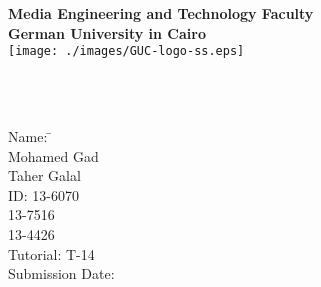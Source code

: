 \newcommand{\titlePage}{

\thispagestyle{empty}
\begin{center}
	\textbf{Media Engineering and Technology Faculty}\\[1mm]
	\textbf{German University in Cairo}\\[1mm]
	\texttt{[image: ./images/GUC-logo-ss.eps]}
	
	\vspace{2cm}
	\doublespacing
	{\large \textbf{\titleOfThesisOne}}\\
	\singlespacing
	\vspace{2cm}
	{\large \textbf{\typeOfThesis}}\\
	
	\vfill
	\parbox{1cm}{
  		\begin{large}
    			\begin{tabbing}
       			Name: \hspace{2cm}  
        			\=\authorOfThesis\\[2mm]
        			\hspace{3.5cm}  Mohamed Gad\\[2mm]
        			\hspace{4cm}   Taher Galal\\[2mm]
        		ID: \hspace{4cm}
        			13-6070\\[2mm]	
        		    \hspace{4.75cm}	
        			13-7516\\[2mm]	
        		 \hspace{4.75cm}	
        			13-4426\\[2mm]	
        		Tutorial: \hspace{3cm}
        			T-14\\[2mm]		
      			Submission Date: 
        			\>\submissionDate\\
    			\end{tabbing}
  		\end{large}
	}\\
\end{center}
\clearpage
}
\titlePage
